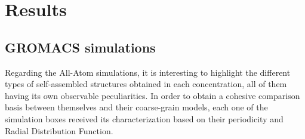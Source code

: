 \documentclass[10pt,a4paper,twoside]{article}
\begin{document}
%
%   
 
\section{Results}
\subsection{GROMACS simulations}
Regarding the All-Atom simulations, it is interesting to highlight the different types of self-assembled  structures obtained in each concentration, all of them having its own observable peculiarities. In order to obtain a cohesive comparison basis between themselves and their coarse-grain models, each one of the simulation boxes received its characterization based on their periodicity and Radial Distribution Function.
\end{document}
